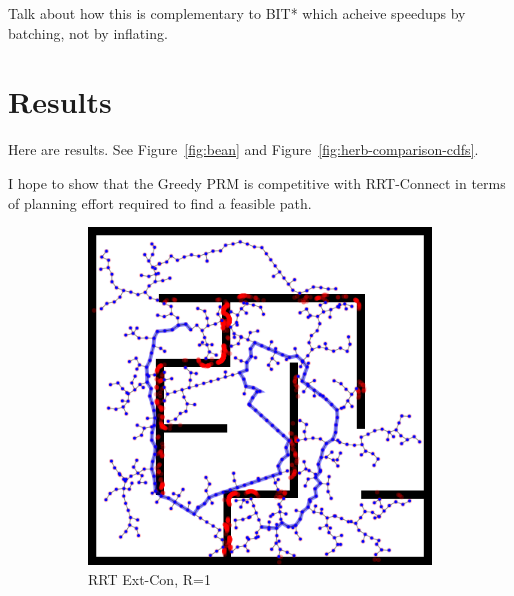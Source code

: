 \documentclass{report}
\begin{document}
Talk about how this is complementary to BIT* which acheive speedups
by batching, not by inflating.

\section{Results}

Here are results.
See Figure~\ref{fig:bean} and Figure~\ref{fig:herb-comparison-cdfs}.

I hope to show that the Greedy PRM is competitive with RRT-Connect
in terms of planning effort required to find a feasible path.

\begin{figure}
\centering
\begin{subfigure}[b]{0.3\textwidth}
\includegraphics[width=\textwidth]{figs/compare-2d-rrtc1-rrtextcon-r1-s1.png}
\caption{RRT Ext-Con, R=1}
\end{subfigure}%
\quad
\begin{subfigure}[b]{0.3\textwidth}

\end{subfigure}
\end{figure}
\end{document}
